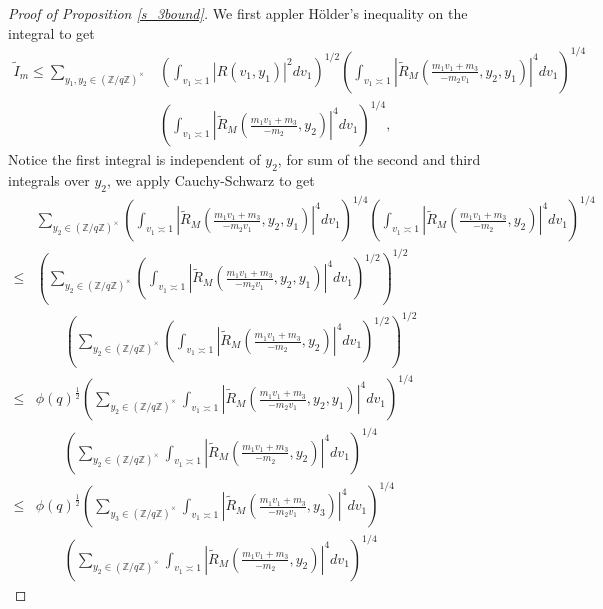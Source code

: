 \begin{proof}[{Proof of Proposition \ref{s_3bound}}]
    We first appler H\"older's inequality on the integral to get 
    \begin{align*}
        \tilde{I}_m \leq  \sum_{y_1,y_2\in (\mathbb{Z}/q\mathbb{Z})^\times}& \left(\int_{v_1\asymp 1} 
        \left|R\left(v_1,y_1\right)\right|^2dv_1\right)^{1/2} \left(\int_{v_1\asymp 1} \left|\tilde{R}_M\left(\frac{m_1v_1+m_3}{-m_2v_1},y_2,y_1\right)\right|^4 dv_1\right)^{1/4} \\& \left(\int_{v_1\asymp 1} 
       \left| \tilde{R}_M(\frac{m_1v_1+m_3}{-m_2},y_2)\right|^{4} dv_1\right)^{1/4},
    \end{align*}
    Notice the first integral is independent of $y_2$, for sum of the second and third integrals over $y_2$, we apply Cauchy-Schwarz to get\begin{align*}
        &\sum_{y_2\in (\mathbb{Z}/q\mathbb{Z})^\times}\left(\int_{v_1\asymp 1} \left|\tilde{R}_M\left(\frac{m_1v_1+m_3}{-m_2v_1},y_2,y_1\right)\right|^4 dv_1\right)^{1/4} \left(\int_{v_1\asymp 1} 
       \left| \tilde{R}_M(\frac{m_1v_1+m_3}{-m_2},y_2)\right|^{4} dv_1\right)^{1/4}\\
       \leq& \left(\sum_{y_2\in (\mathbb{Z}/q\mathbb{Z})^\times}\left(\int_{v_1\asymp 1} \left|\tilde{R}_M\left(\frac{m_1v_1+m_3}{-m_2v_1},y_2,y_1\right)\right|^4 dv_1\right)^{1/2}\right)^{1/2}\\ &\quad \quad
       \left(
       \sum_{y_2\in (\mathbb{Z}/q\mathbb{Z})^\times} \left(\int_{v_1\asymp 1}
       \left| \tilde{R}_M(\frac{m_1v_1+m_3}{-m_2},y_2)\right|^{4} dv_1 \right)^{1/2}\right)^{1/2}
       \\ 
       \leq&  \phi(q)^{\frac{1}{2}} \left(\sum_{y_2\in (\mathbb{Z}/q\mathbb{Z})^\times}\int_{v_1\asymp 1} \left|\tilde{R}_M\left(\frac{m_1v_1+m_3}{-m_2v_1},y_2,y_1\right)\right|^4 dv_1\right)^{1/4}\\ &\quad \quad
       \left(
       \sum_{y_2\in (\mathbb{Z}/q\mathbb{Z})^\times} \int_{v_1\asymp 1}
       \left| \tilde{R}_M(\frac{m_1v_1+m_3}{-m_2},y_2)\right|^{4} dv_1\right)^{1/4} \\
       \leq&  \phi(q)^{\frac{1}{2}} \left(\sum_{y_3\in (\mathbb{Z}/q\mathbb{Z})^\times}\int_{v_1\asymp 1} \left|\tilde{R}_M\left(\frac{m_1v_1+m_3}{-m_2v_1},y_3\right)\right|^4 dv_1\right)^{1/4}\\ &\quad \quad
       \left(
       \sum_{y_2\in (\mathbb{Z}/q\mathbb{Z})^\times} \int_{v_1\asymp 1}
       \left| \tilde{R}_M(\frac{m_1v_1+m_3}{-m_2},y_2)\right|^{4} dv_1\right)^{1/4}

\end{align*}
\end{proof}
